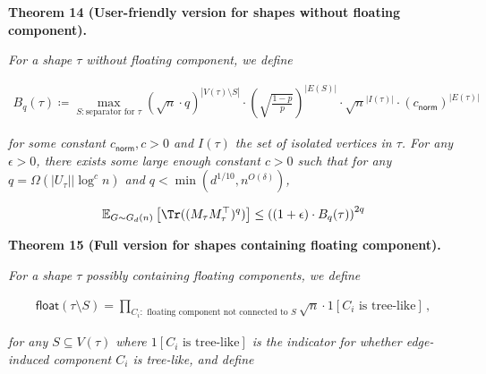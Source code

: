 \documentclass[10pt,a4paper]{article}
\begin{document}


\par\medskip\noindent\textbf{
\textbf{Theorem 14}\textbf{ }(User-friendly version for shapes without floating component)\textbf{.}
}\par



\emph{For a shape $\tau$ without floating component, we define}\par


\[\begin{gathered}
B_{q}(\tau)\coloneqq\max_{S:\text{separator for }\tau}(\sqrt{n}\cdot q)^{|V(\tau)\setminus S|}\cdot\left(\sqrt{\frac{1-p}{p}}\right)^{|E(S)|}\cdot\sqrt{n}^{|I(\tau)|}\cdot(c_{\mathsf{norm}})^{|E(\tau)|}
\end{gathered}\]


\emph{for some constant $c_{\mathsf{norm}},c>0$ and $I(\tau)$ the set of isolated vertices in $\tau$.
For any $\epsilon>0$, there exists some large enough constant $c>0$ such that for any $q=\Omega(|U_{\tau}||\log^{c}n)$ and $q<\min(d^{1/10},n^{O(\delta)})$,}\par


\[\begin{gathered}
\mathbb{E}_{G\sim G_{d}(n)}\left[\Tr((M_{\tau}M_{\tau}^{\top})^{q})\right]\leq\left((1+\epsilon)\cdot B_{q}(\tau)\right)^{2q}
\end{gathered}\]








\par\medskip\noindent\textbf{
\textbf{Theorem 15}\textbf{ }(Full version for shapes containing floating component)\textbf{.}
}\par



\emph{For a shape $\tau$ possibly containing floating components, we define}\par


\[\begin{gathered}
\mathsf{float}(\tau\setminus S)=\prod_{C_{i}:\text{ floating component not connected to }S}\sqrt{n}\cdot 1[C_{i}\text{ is tree-like}]\,,
\end{gathered}\]


\emph{for any $S\subseteq V(\tau)$ where $1[C_{i}\text{ is tree-like}]$ is the indicator for whether edge-induced component $C_{i}$ is tree-like,
and define}\par
\end{document}

